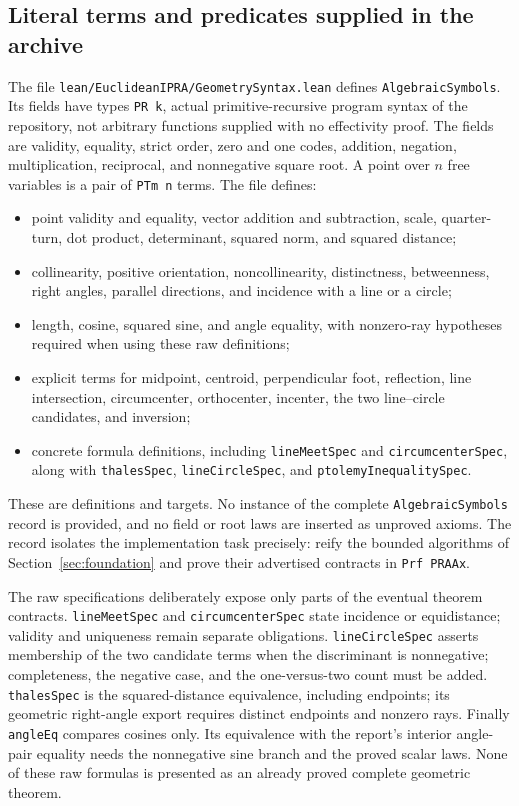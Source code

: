 \subsection{Literal terms and predicates supplied in the archive}
The file \texttt{lean/EuclideanIPRA/GeometrySyntax.lean} defines
\texttt{AlgebraicSymbols}. Its fields have types \texttt{PR k}, actual
primitive-recursive program syntax of the repository, not arbitrary
functions supplied with no effectivity proof. The fields are validity,
equality, strict order, zero and one codes, addition, negation,
multiplication, reciprocal, and nonnegative square root. A point over
$n$ free variables is a pair of \texttt{PTm n} terms. The file defines:
\begin{itemize}
\item point validity and equality, vector addition and subtraction, scale,
quarter-turn, dot product, determinant, squared norm, and squared distance;
\item collinearity, positive orientation, noncollinearity, distinctness,
betweenness, right angles, parallel directions, and incidence with a line
or a circle;
\item length, cosine, squared sine, and angle equality, with nonzero-ray
hypotheses required when using these raw definitions;
\item explicit terms for midpoint, centroid, perpendicular foot,
reflection, line intersection, circumcenter, orthocenter, incenter,
the two line--circle candidates, and inversion;
\item concrete formula definitions, including \texttt{lineMeetSpec} and
\texttt{circumcenterSpec}, along with \texttt{thalesSpec},
\texttt{lineCircleSpec}, and \texttt{ptolemyInequalitySpec}.
\end{itemize}
These are definitions and targets. No instance of the complete
\texttt{AlgebraicSymbols} record is provided, and no field or root laws
are inserted as unproved axioms. The record isolates the implementation
task precisely: reify the bounded algorithms of
Section~\ref{sec:foundation} and prove their advertised contracts in
\texttt{Prf PRAAx}.

The raw specifications deliberately expose only parts of the eventual
theorem contracts. \texttt{lineMeetSpec} and \texttt{circumcenterSpec}
state incidence or equidistance; validity and uniqueness remain separate
obligations. \texttt{lineCircleSpec} asserts membership of the two
candidate terms when the discriminant is nonnegative; completeness,
the negative case, and the one-versus-two count must be added.
\texttt{thalesSpec} is the squared-distance equivalence, including
endpoints; its geometric right-angle export requires distinct endpoints
and nonzero rays. Finally \texttt{angleEq} compares cosines only.
Its equivalence with the report's interior angle-pair equality needs
the nonnegative sine branch and the proved scalar laws. None of these
raw formulas is presented as an already proved complete geometric theorem.

